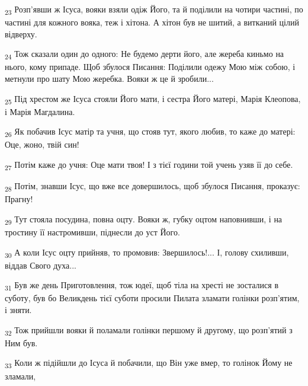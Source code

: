 \begin{tcolorbox}
\textsubscript{23} Розп'явши ж Ісуса, вояки взяли одіж Його, та й поділили на чотири частині, по частині для кожного вояка, теж і хітона. А хітон був не шитий, а витканий цілий відверху.
\end{tcolorbox}
\begin{tcolorbox}
\textsubscript{24} Тож сказали один до одного: Не будемо дерти його, але жереба киньмо на нього, кому припаде. Щоб збулося Писання: Поділили одежу Мою між собою, і метнули про шату Мою жеребка. Вояки ж це й зробили...
\end{tcolorbox}
\begin{tcolorbox}
\textsubscript{25} Під хрестом же Ісуса стояли Його мати, і сестра Його матері, Марія Клеопова, і Марія Магдалина.
\end{tcolorbox}
\begin{tcolorbox}
\textsubscript{26} Як побачив Ісус матір та учня, що стояв тут, якого любив, то каже до матері: Оце, жоно, твій син!
\end{tcolorbox}
\begin{tcolorbox}
\textsubscript{27} Потім каже до учня: Оце мати твоя! І з тієї години той учень узяв її до себе.
\end{tcolorbox}
\begin{tcolorbox}
\textsubscript{28} Потім, знавши Ісус, що вже все довершилось, щоб збулося Писання, проказує: Прагну!
\end{tcolorbox}
\begin{tcolorbox}
\textsubscript{29} Тут стояла посудина, повна оцту. Вояки ж, губку оцтом наповнивши, і на тростину її настромивши, піднесли до уст Його.
\end{tcolorbox}
\begin{tcolorbox}
\textsubscript{30} А коли Ісус оцту прийняв, то промовив: Звершилось!... І, голову схиливши, віддав Свого духа...
\end{tcolorbox}
\begin{tcolorbox}
\textsubscript{31} Був же день Приготовлення, тож юдеї, щоб тіла на хресті не зосталися в суботу, був бо Великдень тієї суботи просили Пилата зламати голінки розп'ятим, і зняти.
\end{tcolorbox}
\begin{tcolorbox}
\textsubscript{32} Тож прийшли вояки й поламали голінки першому й другому, що розп'ятий з Ним був.
\end{tcolorbox}
\begin{tcolorbox}
\textsubscript{33} Коли ж підійшли до Ісуса й побачили, що Він уже вмер, то голінок Йому не зламали,
\end{tcolorbox}
